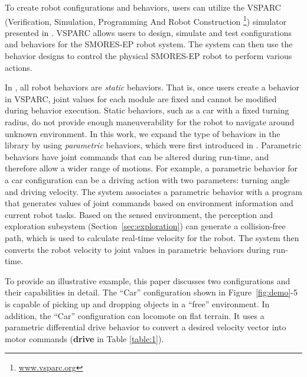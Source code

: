 \documentclass[12pt]{article}
\begin{document}
To create robot configurations and behaviors, users can utilize the VSPARC (Verification, Simulation, Programming And Robot Construction \footnote{\url{www.vsparc.org}}) simulator presented in \cite{Jing2016}.
VSPARC allows users to design, simulate and test configurations and behaviors for the SMORES-EP robot system.
The system can then use the behavior designs to control the physical SMORES-EP robot to perform various actions.

In \cite{Jing2016}, all robot behaviors are \textit{static} behaviors.
That is, once users create a behavior in VSPARC, joint values for each module are fixed and cannot be modified during behavior execution.
Static behaviors, such as a car with a fixed turning radius, do not provide enough maneuverability for the robot to navigate around unknown environment.
In this work, we expand the type of behaviors in the library by using \textit{parametric} behaviors, which were first introduced in \cite{JingAURO2017}.
Parametric behaviors have joint commands that can be altered during run-time, and therefore allow a wider range of motions.
For example, a parametric behavior for a car configuration can be a driving action with two parameters: turning angle and driving velocity.  
The system associates a parametric behavior with a program that generates values of joint commands based on environment information and current robot tasks.
Based on the sensed environment, the perception and exploration subsystem (Section~\ref{sec:exploration}) can generate a collision-free path, which is used to calculate real-time velocity for the robot.
The system then converts the robot velocity to joint values in parametric behaviors during run-time.


To provide an illustrative example, this paper discusses two configurations and their capabilities in detail.
The ``Car'' configuration shown in Figure~\ref{fig:demo}-5 is capable of picking
up and dropping objects in a ``free'' environment. In addition, the ``Car'' configuration can locomote on flat terrain. It uses a parametric differential drive behavior to convert a desired velocity vector into motor commands (\textbf{drive} in Table \ref{table:1}).
\end{document}
